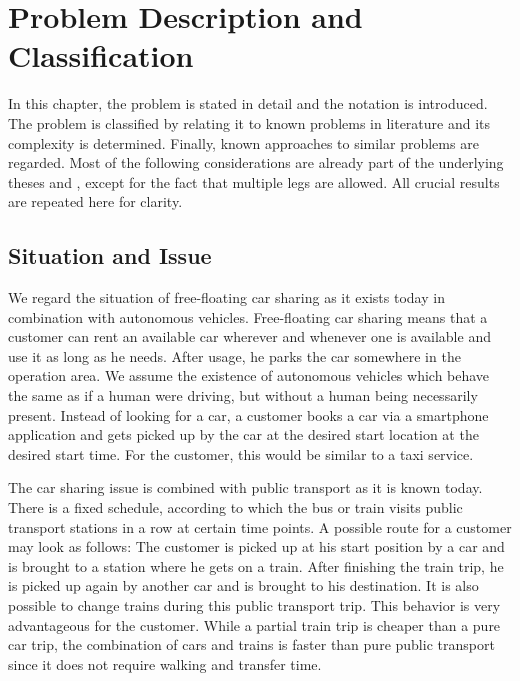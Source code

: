 \chapter{Problem Description and Classification}
\label{ch:problem_description}

In this chapter, the problem is stated in detail and the notation is introduced. The problem is classified by relating it to known problems in literature and its complexity is determined. Finally, known approaches to similar problems are regarded. Most of the following considerations are already part of the underlying theses \cite{Kaiser} and \cite{Knoll}, except for the fact that multiple legs are allowed. All crucial results are repeated here for clarity.

\section{Situation and Issue}

We regard the situation of free-floating car sharing as it exists today in combination with autonomous vehicles. Free-floating car sharing means that a customer can rent an available car wherever and whenever one is available and use it as long as he needs. After usage, he parks the car somewhere in the operation area. We assume the existence of autonomous vehicles which behave the same as if a human were driving, but without a human being necessarily present. Instead of looking for a car, a customer books a car via a smartphone application and gets picked up by the car at the desired start location at the desired start time. For the customer, this would be similar to a taxi service. 

The car sharing issue is combined with public transport as it is known today. There is a fixed schedule, according to which the bus or train visits public transport stations in a row at certain time points. A possible route for a customer may look as follows: The customer is picked up at his start position by a car and is brought to a station where he gets on a train. After finishing the train trip, he is picked up again by another car and is brought to his destination. It is also possible to change trains during this public transport trip. This behavior is very advantageous for the customer. While a partial train trip is cheaper than a pure car trip, the combination of cars and trains is faster than pure public transport since it does not require walking and transfer time.

\newpage

